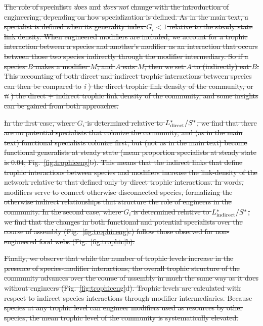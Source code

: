 \documentclass[twocolumn,preprintnumbers,amsmath,amssymb,superscriptaddress,linenumbers]{revtex4-1}
\providecommand{\DIFdel}[1]{{\protect\color{red}\sout{#1}}}                      %
\begin{document}
\DIFdel{The role of specialists }\emph{\DIFdel{does}} %
\DIFdel{and }\emph{\DIFdel{does not}} %
\DIFdel{change with the introduction of engineering, depending on how specialization is defined.
As in the main text, a specialist is defined when its generality index $G_i < 1$ relative to the steady state link density.
When engineered modifiers are included, we account for a trophic interaction between a species and another's modifier as an interaction that occurs between those two species indirectly through the modifier intermediary.
So if a species $B$ makes a modifier $M$, and $A$ eats $M$, then we set $A$ to (indirectly) eat $B$.
This accounting of both direct and indirect trophic interactions between species can then be compared to }\emph{\DIFdel{i}}%
\DIFdel{) the direct trophic link density of the community, or }\emph{\DIFdel{ii}}%
\DIFdel{) the direct + indirect trophic link density of the community, and some insights can be gained from both approaches.
}%

\DIFdel{In the first case, where $G_i$ is determined relative to $L^*_{\rm direct}/S^*$, we find that there are no potential specialists that colonize the community, and (as in the main text) functional specialists colonize first, but (not as in the main text) become functional generalists at steady state (mean proportion specialists at steady state is 0.04; Fig.\ \ref{fig:trophiceng}b).
This means that the indirect links that define trophic interactions between species and modifiers increase the link-density of the network relative to that defined only by direct trophic interactions.
In words, modifiers serve to connect otherwise disconnected species, formalizing the otherwise indirect relationships that structure the role of engineers in the community.
In the second case, where $G_i$ is determined relative to $L^*_{\rm indirect}/S^*$, we find that the changes in both functional and potential specialists over the course of assembly (Fig.\ \ref{fig:trophiceng}c) follow those observed for non-engineered food webs (Fig.\ \ref{fig:trophic}b).
}%

\DIFdel{Finally, we observe that while the number of trophic levels increase in the presence of species-modifier interactions, the overall trophic structure of the community advances over the course of assembly in much the same way as it does without engineers (Fig.\ \ref{fig:trophiceng}d).
Trophic levels are calculated with respect to indirect species interactions through modifier intermediaries.
Because species at any trophic level can engineer modifiers used as resources by other species, the mean trophic level of the community is systematically elevated.
}%
\end{document}

